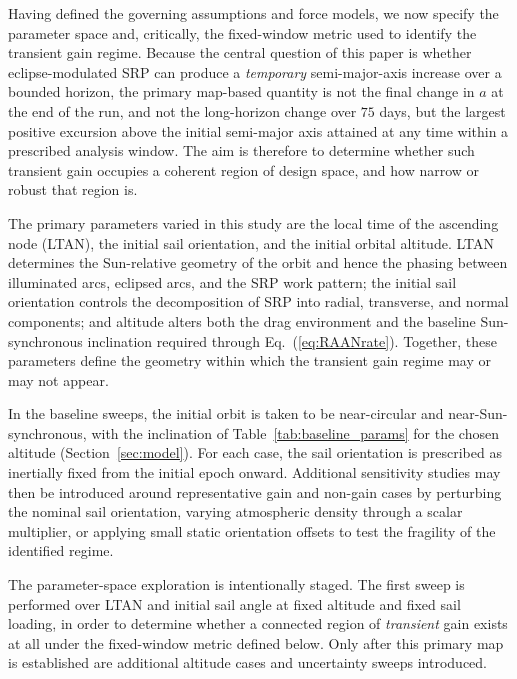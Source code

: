 \FloatBarrier
\noindent Having defined the governing assumptions and force models, we now specify the parameter space and, critically, the fixed-window metric used to identify the transient gain regime. Because the central question of this paper is whether eclipse-modulated SRP can produce a \emph{temporary} semi-major-axis increase over a bounded horizon, the primary map-based quantity is not the final change in \(a\) at the end of the run, and not the long-horizon change over \(75\) days, but the largest positive excursion above the initial semi-major axis attained at any time within a prescribed analysis window. The aim is therefore to determine whether such transient gain occupies a coherent region of design space, and how narrow or robust that region is.

\vspace{5pt}
\par\noindent The primary parameters varied in this study are the local time of the ascending node (LTAN), the initial sail orientation, and the initial orbital altitude. LTAN determines the Sun-relative geometry of the orbit and hence the phasing between illuminated arcs, eclipsed arcs, and the SRP work pattern; the initial sail orientation controls the decomposition of SRP into radial, transverse, and normal components; and altitude alters both the drag environment and the baseline Sun-synchronous inclination required through Eq.~(\ref{eq:RAANrate}). Together, these parameters define the geometry within which the transient gain regime may or may not appear.

\vspace{5pt}
\par\noindent In the baseline sweeps, the initial orbit is taken to be near-circular and near-Sun-synchronous, with the inclination of Table~\ref{tab:baseline_params} for the chosen altitude (Section~\ref{sec:model}). For each case, the sail orientation is prescribed as inertially fixed from the initial epoch onward. Additional sensitivity studies may then be introduced around representative gain and non-gain cases by perturbing the nominal sail orientation, varying atmospheric density through a scalar multiplier, or applying small static orientation offsets to test the fragility of the identified regime.

\vspace{5pt}
\par\noindent The parameter-space exploration is intentionally staged. The first sweep is performed over LTAN and initial sail angle at fixed altitude and fixed sail loading, in order to determine whether a connected region of \emph{transient} gain exists at all under the fixed-window metric defined below. Only after this primary map is established are additional altitude cases and uncertainty sweeps introduced.

